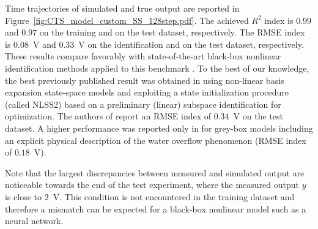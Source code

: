 \documentclass{article} %
\begin{document}
Time trajectories of simulated and true output  are reported in Figure~\ref{fig:CTS_model_custom_SS_128step.pdf}. 
The achieved $R^2$ index  is $0.99$ and $0.97$ on the training and on the test dataset, respectively. The RMSE index is $0.08$~V and $0.33$~V on the identification and on the test dataset, respectively.
These results compare favorably with state-of-the-art black-box nonlinear identification methods applied to this benchmark \citep{relan2017unstructured, birpoutsoukis2018efficient, svensson2017flexible}. 
{To the best of our knowledge, the best previously published result was obtained in \cite{relan2017unstructured} using non-linear 
basis expansion state-space models and exploiting a state initialization procedure (called NLSS2) based on a preliminary (linear) subspace identification for optimization. The authors of \citep{relan2017unstructured} report an RMSE index of $0.34$~V on the test dataset.}
A higher performance  was reported  only in \citep{rogers2017grey} for grey-box models including an explicit physical description of the water overflow phenomenon (RMSE index of $0.18$~V). 
 
Note that the largest discrepancies between measured and simulated output are noticeable towards the end of the test experiment, where the measured output $y$ is close to $2$~V. This condition is not encountered in the training dataset and therefore a mismatch can be expected for a  black-box nonlinear  model such as a neural network.
	
\end{document}
